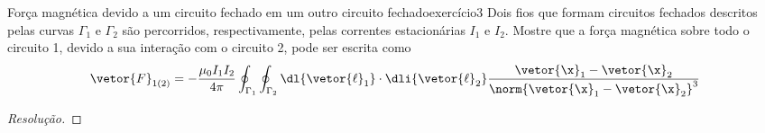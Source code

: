 \begin{exercício}{Força magnética devido a um circuito fechado em um outro circuito fechado}{exercício3}
    Dois fios que formam circuitos fechados descritos pelas curvas \(\Gamma_1\) e \(\Gamma_2\) são percorridos, respectivamente, pelas correntes estacionárias \(I_1\) e \(I_2\).
    Mostre que a força magnética sobre todo o circuito 1, devido a sua interação com o circuito 2, pode ser escrita como
    \begin{equation*}
        \vetor{F}_{1(2)} =-\frac{\mu_0 I_1 I_2}{4\pi} \oint_{\Gamma_1}\oint_{\Gamma_2}{\dl{\vetor{\ell}_1}\cdot \dli{\vetor{\ell}_2} \frac{\vetor{\x}_1 - \vetor{\x}_2}{\norm{\vetor{\x}_1 - \vetor{\x}_2}^3}}
    \end{equation*}
\end{exercício}
\begin{proof}[Resolução]

\end{proof}
